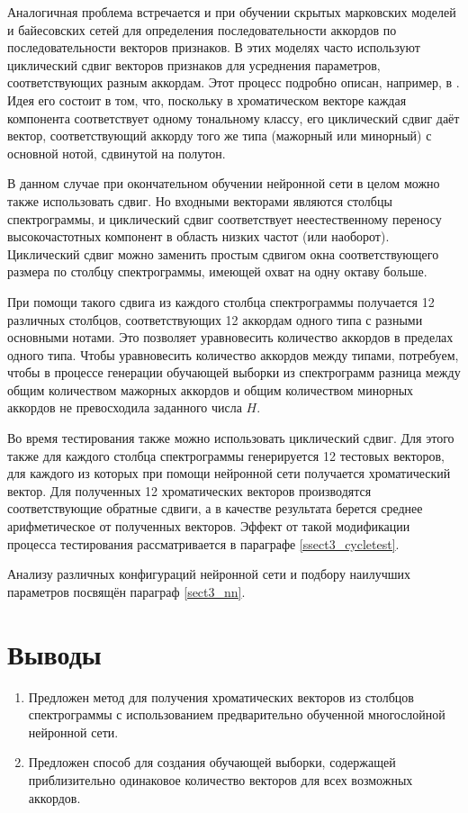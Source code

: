 Аналогичная проблема встречается и при обучении скрытых марковских моделей и
байесовских сетей для определения последовательности аккордов по
последовательности векторов признаков. В этих моделях часто используют
циклический сдвиг векторов признаков для усреднения параметров, соответствующих
разным аккордам. Этот процесс подробно описан, например, в \cite{Sheh2003}. Идея
его состоит в том, что, поскольку в хроматическом векторе каждая компонента
соответствует одному тональному классу, его циклический сдвиг даёт вектор,
соответствующий аккорду того же типа (мажорный или минорный) с основной нотой,
сдвинутой на полутон.

В данном случае при окончательном обучении нейронной сети в целом можно также
использовать сдвиг. Но входными векторами являются столбцы спектрограммы, и
циклический сдвиг соответствует неестественному переносу высокочастотных
компонент в область низких частот (или наоборот). Циклический сдвиг можно
заменить простым сдвигом окна соответствующего размера по столбцу спектрограммы,
имеющей охват на одну октаву больше.

При помощи такого сдвига из каждого столбца спектрограммы получается 12
различных столбцов, соответствующих 12 аккордам одного типа с разными основными
нотами. Это позволяет уравновесить количество аккордов в пределах одного типа.
Чтобы уравновесить количество аккордов между типами, потребуем, чтобы в процессе
генерации обучающей выборки из спектрограмм разница между общим количеством
мажорных аккордов и общим количеством минорных аккордов не превосходила
заданного числа $H$.

Во время тестирования также можно использовать циклический сдвиг. Для этого
также для каждого столбца спектрограммы генерируется 12 тестовых векторов, для
каждого из которых при помощи нейронной сети получается хроматический вектор.
Для полученных 12 хроматических векторов производятся соответствующие обратные
сдвиги, а в качестве результата берется среднее арифметическое от полученных
векторов. Эффект от такой модификации процесса тестирования рассматривается в
параграфе \ref{ssect3_cycletest}.

Анализу различных конфигураций нейронной сети и подбору наилучших параметров
посвящён параграф \ref{sect3_nn}.

\section{Выводы}

\begin{enumerate}
  \item Предложен метод для получения хроматических векторов из столбцов
  спектрограммы с использованием предварительно обученной многослойной нейронной
  сети.
  \item Предложен способ для создания обучающей выборки, содержащей
  приблизительно одинаковое количество векторов для всех возможных аккордов.
\end{enumerate}

